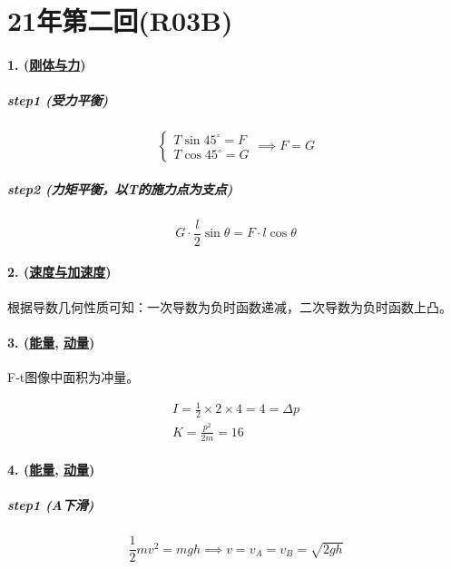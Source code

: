 
\section{21年第二回(R03B)}

\paragraph{1. (\hyperref[subsec:刚体与力]{刚体与力})}

\subparagraph{step1 (受力平衡)}

\begin{equation*}
    \begin{cases}
        T\sin45^\circ=F\\
        T\cos45^\circ=G
    \end{cases}\implies F=G
\end{equation*}

\subparagraph{step2 (力矩平衡，以T的施力点为支点)}

\begin{equation*}
    G\cdot\frac{l}{2}\sin\theta=F\cdot l\cos\theta
\end{equation*}

\paragraph{2. (\hyperref[subsec:速度与加速度]{速度与加速度})} 根据导数几何性质可知：一次导数为负时函数递减，二次导数为负时函数上凸。
\paragraph{3. (\hyperref[subsec:能量]{能量}, \hyperref[subsec:动量]{动量})} F-t图像中面积为冲量。

\begin{gather*}
    I=\frac12\times2\times4=4=\Delta p\\
    K=\frac{p^2}{2m}=16
\end{gather*}

\paragraph{4. (\hyperref[subsec:能量]{能量}, \hyperref[subsec:动量]{动量})}

\subparagraph{step1 (A下滑)}

\begin{equation*}
    \frac12mv^2=mgh\implies v=v_A=v_B=\sqrt{2gh}
\end{equation*}


